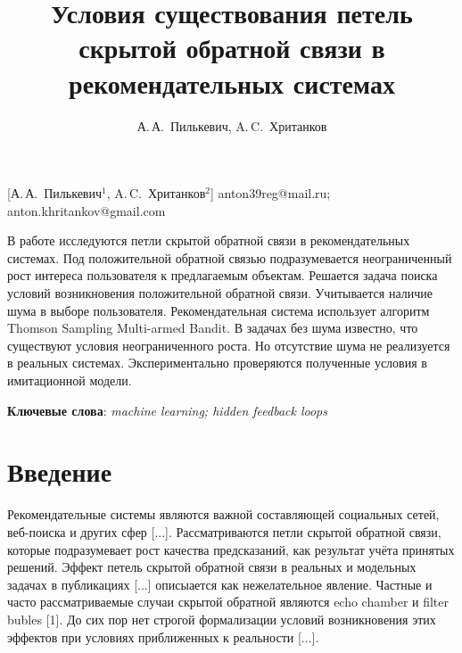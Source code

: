 \documentclass[12pt, twoside]{article}
\begin{document}
\title
    [] %
    {Условия существования петель скрытой обратной связи в рекомендательных системах}
\author
    [А.\,А.~Пилькевич] %
    {А.\,А.~Пилькевич, A.\,C.~Хританков} %
    [А.\,А.~Пилькевич$^1$, A.\,C.~Хританков$^2$] %
\email
   {anton39reg@mail.ru; anton.khritankov@gmail.com}
\abstract
  {В работе исследуются петли скрытой обратной связи в рекомендательных системах.
  Под положительной обратной связью подразумевается неограниченный рост интереса пользователя к предлагаемым объектам. 
  Решается задача поиска условий возникновения положительной обратной связи. 
  Учитывается наличие шума в выборе пользователя.
  Рекомендательная система использует алгоритм Thomson Sampling Multi-armed Bandit.
  В задачах без шума известно, что существуют условия неограниченного роста. 
  Но отсутствие шума не реализуется в реальных системах.
  Экспериментально проверяются полученные условия в имитационной модели.

\bigskip
\noindent
\textbf{Ключевые слова}: \emph {machine learning; hidden feedback loops }
}
\doi{}
\receivedRus{}
\receivedEng{}

\maketitle
\linenumbers
\section{Введение}
Рекомендательные системы являются важной составляющей социальных сетей, веб-поиска и других сфер [...]. 
Рассматриваются петли скрытой обратной связи, которые подразумевает рост качества предсказаний, как результат учёта принятых решений. 
Эффект петель скрытой обратной связи в реальных и модельных задачах в  публикациях [...] описыается как нежелательное явление. 
Частные и часто рассматриваемые случаи скрытой обратной являются echo chamber и filter bubles [1].
До сих пор нет строгой формализации условий возникновения этих эффектов при условиях приближенных к реальности [...]. 
\end{document}
